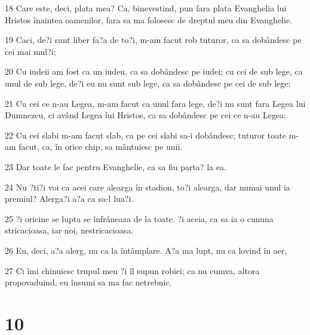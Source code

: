 \par 18 Care este, deci, plata mea? Ca, binevestind, pun fara plata Evanghelia lui Hristos înaintea oamenilor, fara sa ma folosesc de dreptul meu din Evanghelie.
\par 19 Caci, de?i sunt liber fa?a de to?i, m-am facut rob tuturor, ca sa dobândesc pe cei mai mul?i;
\par 20 Cu iudeii am fost ca un iudeu, ca sa dobândesc pe iudei; cu cei de sub lege, ca unul de sub lege, de?i eu nu sunt sub lege, ca sa dobândesc pe cei de sub lege;
\par 21 Cu cei ce n-au Legea, m-am facut ca unul fara lege, de?i nu sunt fara Legea lui Dumnezeu, ci având Legea lui Hristos, ca sa dobândesc pe cei ce n-au Legea;
\par 22 Cu cei slabi m-am facut slab, ca pe cei slabi sa-i dobândesc; tuturor toate m-am facut, ca, în orice chip, sa mântuiesc pe unii.
\par 23 Dar toate le fac pentru Evanghelie, ca sa fiu parta? la ea.
\par 24 Nu ?ti?i voi ca acei care alearga în stadion, to?i alearga, dar numai unul ia premiul? Alerga?i a?a ca sa-l lua?i.
\par 25 ?i oricine se lupta se înfrâneaza de la toate. ?i aceia, ca sa ia o cununa stricacioasa, iar noi, nestricacioasa.
\par 26 Eu, deci, a?a alerg, nu ca la întâmplare. A?a ma lupt, nu ca lovind în aer,
\par 27 Ci îmi chinuiesc trupul meu ?i îl supun robiei; ca nu cumva, altora propovaduind, eu însumi sa ma fac netrebnic.

\chapter{10}

